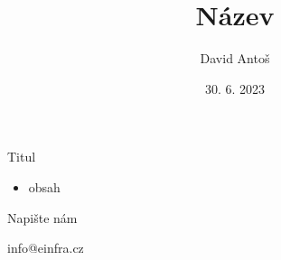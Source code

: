\documentclass[aspectratio=169]{beamer}
\begin{document}
\title{Název}
\author[D.A.]{David Antoš}
\date{30. 6. 2023}

\begin{frame}[plain]
  \maketitle
\end{frame}

\begin{frame}{Titul}
  \begin{itemize}
    \item obsah
  \end{itemize}
\end{frame}

\begin{lastframe}{}
  \vspace*{.35\textheight}\par %
  Napište nám
  \par
  info@einfra.cz
  \iffalse
  \vbox to \textheight{
    \vfill
    \hbox to \textwidth{
    \hfill
  \small author contact
\kern3pt
}
}
\fi
\end{lastframe}
\end{document}
